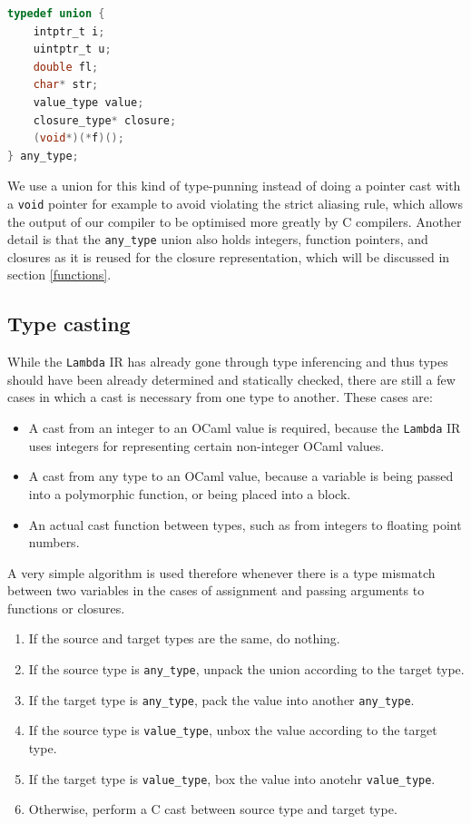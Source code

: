 \documentclass[12pt,a4paper,twoside,openright]{report}
\begin{document}
\begin{lstlisting}[language=C]
typedef union {
    intptr_t i;
    uintptr_t u;
    double fl;
    char* str;
    value_type value;
    closure_type* closure;
    (void*)(*f)();
} any_type;
\end{lstlisting}

We use a union for this kind of type-punning instead of doing a pointer cast 
with a \verb|void| pointer for example to avoid violating the strict aliasing 
rule, which allows the output of our compiler to be optimised more greatly by C 
compilers. Another detail is that the \verb|any_type| union also holds 
integers, function pointers, and closures as it is reused for the closure 
representation, which will be discussed in section \ref{functions}.

\subsection{Type casting} \label{casting}

While the \texttt{Lambda} IR has already gone through type inferencing and thus 
types should have been already determined and statically checked, there are 
still a few cases in which a cast is necessary from one type to another. These 
cases are:

\begin{itemize}
    \item A cast from an integer to an OCaml value is required, because the 
    \texttt{Lambda} IR uses integers for representing certain non-integer OCaml 
    values.
    \item A cast from any type to an OCaml value, because a variable is being 
    passed into a polymorphic function, or being placed into a block.
    \item An actual cast function between types, such as from integers to 
    floating point numbers.
\end{itemize}

A very simple algorithm is used therefore whenever there is a type mismatch 
between two variables in the cases of assignment and passing arguments to 
functions or closures.

\begin{enumerate}
\item If the source and target types are the same, do nothing.
\item If the source type is \verb|any_type|, unpack the union according to the 
target type.
\item If the target type is \verb|any_type|, pack the value into another 
\verb|any_type|.
\item If the source type is \verb|value_type|, unbox the value according to the 
target type.
\item If the target type is \verb|value_type|, box the value into anotehr 
\verb|value_type|.
\item Otherwise, perform a C cast between source type and target type.
\end{enumerate}
\end{document}
